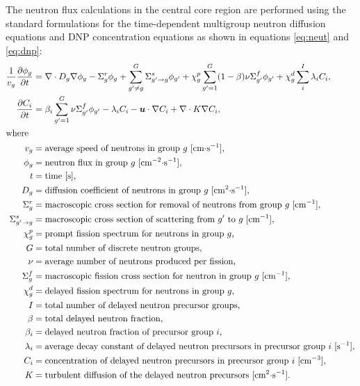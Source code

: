 The neutron flux calculations in the central core region are
performed using the standard formulations for the time-dependent multigroup
neutron diffusion equations and \gls{DNP} concentration equations as shown in
equations \ref{eq:neut} and \ref{eq:dnp}:
%
\begin{align}
    \frac{1}{v_g} \frac{\partial \phi_g}{\partial t} &= \nabla \cdot D_g
    \nabla \phi_g - \Sigma^r_g \phi_g +
    \sum^G_{g' \neq g} \Sigma^s_{g' \rightarrow g} \phi_{g'} + \chi^p_g
    \sum^G_{g'=1} (1-\beta) \nu \Sigma^f_{g'} \phi_{g'} + \chi^d_g \sum^I_i
    \lambda_i C_i, \label{eq:neut} \\
    \frac{\partial C_i}{\partial t} &= \beta_i \sum^G_{g'=1} \nu \Sigma^f_{g'}
    \phi_{g'} - \lambda_i C_i - \boldsymbol{u} \cdot \nabla C_i + \nabla \cdot
    K \nabla C_i, \label{eq:dnp} \\
    \intertext{where}
    v_g &= \text{average speed of neutrons in group $g$ [cm$\cdot$s$^{-1}$],} 
    \nonumber \\
    \phi_g &= \text{neutron flux in group $g$ [cm$^{-2}\cdot$s$^{-1}$],}
    \nonumber \\
    t &= \text{time [s],} \nonumber \\
    D_g &= \text{diffusion coefficient of neutrons in group $g$
    [cm$^2\cdot$s$^{-1}$],} \nonumber \\
    \Sigma^r_g &= \text{macroscopic cross section for removal of neutrons from
    group $g$ [cm$^{-1}$],} \nonumber \\
    \Sigma^s_{g' \rightarrow g} &= \text{macroscopic cross section of
    scattering from $g'$ to $g$ [cm$^{-1}$],} \nonumber \\
    \chi^p_g &= \text{prompt fission spectrum for neutrons in group $g$,}
    \nonumber \\
    G &= \text{total number of discrete neutron groups,} \nonumber \\
    \nu &= \text{average number of neutrons produced per fission,} \nonumber
    \\
    \Sigma^f_{g} &= \text{macroscopic fission cross section for neutron in
    group $g$ [cm$^{-1}$],} \nonumber \\
    \chi^d_g &= \text{delayed fission spectrum for neutrons in group $g$,}
    \nonumber \\
    I &= \text{total number of delayed neutron precursor groups,} \nonumber \\
    \beta &= \text{total delayed neutron fraction,} \nonumber \\
    \beta_i &= \text{delayed neutron fraction of precursor group $i$,}
    \nonumber \\
    \lambda_i &= \text{average decay constant of delayed neutron precursors in
    precursor group $i$ [s$^{-1}$],} \nonumber \\
    C_i &= \text{concentration of delayed neutron precursors in precursor
    group $i$ [cm$^{-3}$],} \nonumber \\
    K &= \text{turbulent diffusion of the delayed neutron precursors
    [cm$^2\cdot$s$^{-1}$].} \nonumber
\end{align}
%

